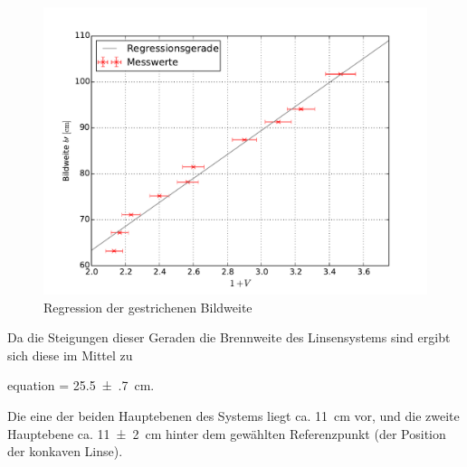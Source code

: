 	\begin{figure}[!h]
		\centering
		\includegraphics[scale=.7]{Grafiken/Messwerte_Abbe1.pdf}
		\caption{Regression der gestrichenen Bildweite\label{fig:Auswertung_AbbeB}}
	\end{figure}
	
	
	
	
	Da die Steigungen dieser Geraden die Brennweite des Linsensystems sind ergibt sich
	diese im Mittel zu
 	\begin{empheq}{equation}
 		\label{val:Auswertung Abbe}
 		 = \SI{25.5(7)}{\centi\meter}.
 	\end{empheq}
 	
 	Die eine der beiden Hauptebenen des Systems liegt ca. \SI{11}{\centi\meter} vor,
 	und die zweite Hauptebene ca. \SI{11(2)}{\centi\meter} hinter dem gewählten 
 	Referenzpunkt (der Position der konkaven Linse).  
 	